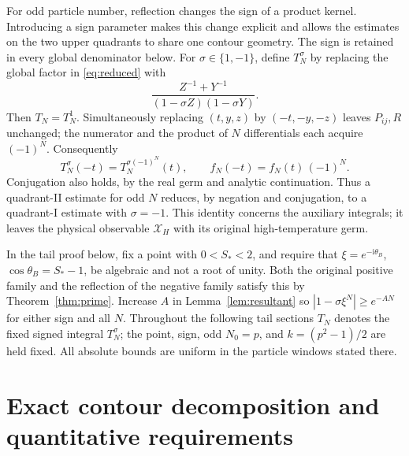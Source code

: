 \documentclass[11pt]{article}
\numberwithin{equation}{section}
\theoremstyle{definition}
\newcommand{\ii}{\mathrm i}
\begin{document}
For odd particle number, reflection changes the sign of a product
kernel. Introducing a sign parameter makes this change explicit and
allows the estimates on the two upper quadrants to share one contour
geometry. The sign is retained in every global denominator below.
For $\sigma\in\{1,-1\}$, define $T_N^\sigma$ by replacing
the global factor in \eqref{eq:reduced} with
\[
 \frac{Z^{-1}+Y^{-1}}{(1-\sigma Z)(1-\sigma Y)}.
\]
Then $T_N=T_N^1$. Simultaneously replacing
$(t,y,z)$ by $(-t,-y,-z)$ leaves $P_{ij},R$ unchanged;
the numerator and the product of $N$ differentials each acquire
$(-1)^N$. Consequently
\begin{equation}
 T_N^\sigma(-t)=T_N^{\sigma(-1)^N}(t),
 \qquad f_N(-t)=f_N(t)\,(-1)^N.
 \label{eq:signidentity}
\end{equation}
Conjugation also holds, by the real germ and analytic continuation.
Thus a quadrant-II estimate for odd $N$ reduces, by negation and
conjugation, to a quadrant-I estimate with $\sigma=-1$. This identity concerns the auxiliary integrals; it leaves the physical
observable $\mathcal X_H$ with its original high-temperature germ.

In the tail proof below, fix a point with $0<S_*<2$, and require
that $\xi=e^{-\ii\theta_B}$, $\cos\theta_B=S_*-1$, be algebraic
and not a root of unity. Both the original positive family and the
reflection of the negative family satisfy this by
Theorem~\ref{thm:prime}. Increase $A$ in Lemma~\ref{lem:resultant}
so $|1-\sigma\xi^N|\ge e^{-AN}$ for either sign and all $N$.
Throughout the following tail sections $T_N$ denotes the fixed
signed integral $T_N^\sigma$; the point, sign, odd $N_0=p$, and
$k=(p^2-1)/2$ are held fixed. All absolute bounds are uniform in
the particle windows stated there.

\section{Exact contour decomposition and quantitative requirements}
\label{sec:tailreduction}
\end{document}
